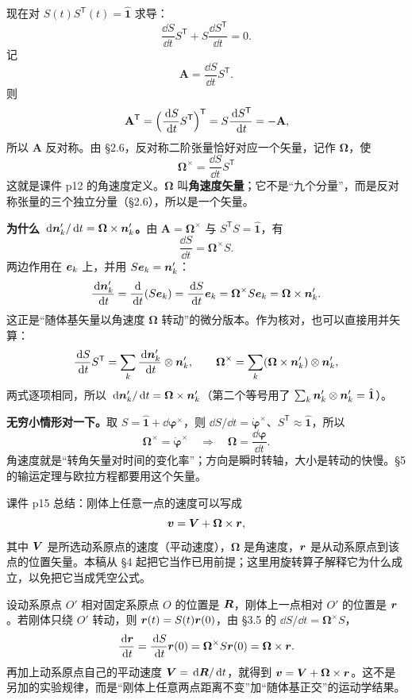 \documentclass[11pt]{ctexart}
\newcommand{\ten}[1]{\mathbf{#1}}
\newcommand{\unitd}{\hat{\ten{1}}}
\let\origsubhdr\subhdr
\renewcommand{\subhdr}[1]{\par\needspace{3\baselineskip}\origsubhdr{#1}}
\begin{document}
现在对 $S(t)S^{\mathsf T}(t)=\unitd$ 求导：
\[
\frac{\dd S}{\dd t}S^{\mathsf T}+S\frac{\dd S^{\mathsf T}}{\dd t}=0 .
\]
记
\[
\ten A=\frac{\dd S}{\dd t}S^{\mathsf T}.
\]
则
\[
\ten A^{\mathsf T}=\Bigl(\frac{\dd S}{\dd t}S^{\mathsf T}\Bigr)^{\mathsf T}
=S\frac{\dd S^{\mathsf T}}{\dd t}=-\ten A,
\]
所以 $\ten A$ 反对称。由 \S2.6，反对称二阶张量恰好对应一个矢量，记作 $\boldsymbol\Omega$，使
\[
\boxed{\;\boldsymbol\Omega^{\times}=\frac{\dd S}{\dd t}S^{\mathsf T}\;}
\]
这就是课件 p12 的角速度定义。$\boldsymbol\Omega$ 叫\textbf{角速度矢量}；它不是“九个分量”，而是反对称张量的三个独立分量（\S2.6），所以是一个矢量。

\textbf{为什么 $\,\mathrm{d}\boldsymbol{n}'_k/\,\mathrm{d} t=\boldsymbol\Omega\times\boldsymbol{n}'_k$。}由 $\ten A=\boldsymbol\Omega^{\times}$ 与 $S^{\mathsf T}S=\unitd$，有
\[
\frac{\dd S}{\dd t}=\boldsymbol\Omega^{\times}S .
\]
两边作用在 $\boldsymbol{e}_k$ 上，并用 $S\boldsymbol{e}_k=\boldsymbol{n}'_k$：
\[
\frac{\,\mathrm{d}\boldsymbol{n}'_k}{\,\mathrm{d} t}=\frac{\,\mathrm{d}}{\,\mathrm{d} t}(S\boldsymbol{e}_k)=\frac{\,\mathrm{d} S}{\,\mathrm{d} t}\boldsymbol{e}_k=\boldsymbol\Omega^{\times}S\boldsymbol{e}_k=\boldsymbol\Omega\times\boldsymbol{n}'_k .
\]
这正是“随体基矢量以角速度 $\boldsymbol\Omega$ 转动”的微分版本。作为核对，也可以直接用并矢算：
\[
\frac{\,\mathrm{d} S}{\,\mathrm{d} t}S^{\mathsf T}
=\sum_k\frac{\,\mathrm{d}\boldsymbol{n}'_k}{\,\mathrm{d} t}\otimes\boldsymbol{n}'_k,
\qquad
\boldsymbol\Omega^{\times}=\sum_k(\boldsymbol\Omega\times\boldsymbol{n}'_k)\otimes\boldsymbol{n}'_k,
\]
两式逐项相同，所以 $\,\mathrm{d}\boldsymbol{n}'_k/\,\mathrm{d} t=\boldsymbol\Omega\times\boldsymbol{n}'_k$（第二个等号用了 $\sum_k\vect n'_k\otimes\vect n'_k=\unitd$）。

\textbf{无穷小情形对一下。}取 $S=\unitd+\dd{\boldsymbol\varphi}^{\times}$，则 $\dd S/\dd t=\dot{\boldsymbol\varphi}^{\times}$、$S^{\mathsf T}\approx\unitd$，所以
\[
\boldsymbol\Omega^{\times}=\dot{\boldsymbol\varphi}^{\times}
\quad\Longrightarrow\quad
\boldsymbol\Omega=\frac{\dd{\boldsymbol\varphi}}{\dd t}.
\]
角速度就是“转角矢量对时间的变化率”；方向是瞬时转轴，大小是转动的快慢。\S5 的输运定理与欧拉方程都要用这个矢量。

\label{subsec:rigidvelocity}

课件 p15 总结：刚体上任意一点的速度可以写成
\[
\boldsymbol{v}=\boldsymbol{V}+\boldsymbol\Omega\times\boldsymbol{r},
\]
其中 $\boldsymbol{V}$ 是所选动系原点的速度（平动速度），$\boldsymbol\Omega$ 是角速度，$\boldsymbol{r}$ 是从动系原点到该点的位置矢量。本稿从 \S4 起把它当作已用前提；这里用旋转算子解释它为什么成立，以免把它当成凭空公式。

设动系原点 $O'$ 相对固定系原点 $O$ 的位置是 $\boldsymbol{R}$，刚体上一点相对 $O'$ 的位置是 $\boldsymbol{r}$。若刚体只绕 $O'$ 转动，则 $\boldsymbol{r}(t)=S(t)\boldsymbol{r}(0)$，由 \S3.5 的 $\dd S/\dd t=\boldsymbol\Omega^{\times}S$，
\[
\frac{\,\mathrm{d}\boldsymbol{r}}{\,\mathrm{d} t}=\frac{\,\mathrm{d} S}{\,\mathrm{d} t}\boldsymbol{r}(0)=\boldsymbol\Omega^{\times}S\boldsymbol{r}(0)=\boldsymbol\Omega\times\boldsymbol{r} .
\]
再加上动系原点自己的平动速度 $\boldsymbol{V}=\,\mathrm{d}\boldsymbol{R}/\,\mathrm{d} t$，就得到 $\boldsymbol{v}=\boldsymbol{V}+\boldsymbol\Omega\times\boldsymbol{r}$。这不是另加的实验规律，而是“刚体上任意两点距离不变”加“随体基正交”的运动学结果。
\end{document}
